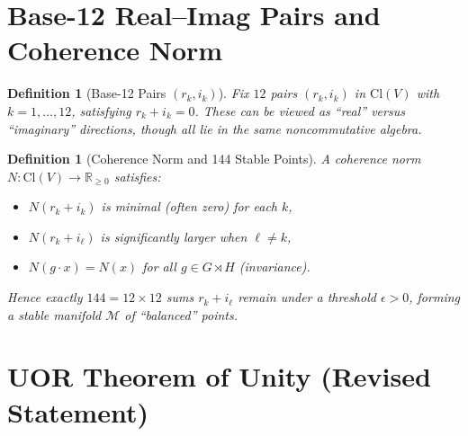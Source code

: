 \documentclass[11pt]{article}
\newtheorem{definition}[theorem]{Definition}
\begin{document}
\section{Base-12 Real--Imag Pairs and Coherence Norm}
\label{sec:base12}

\begin{definition}[Base-12 Pairs $(r_k,i_k)$]
Fix $12$ pairs $(r_k,i_k)$ in $\mathrm{Cl}(V)$ with $k=1,\dots,12$, satisfying $r_k + i_k=0$.  
These can be viewed as “real” versus “imaginary” directions, though all lie in the same noncommutative algebra.
\end{definition}

\begin{definition}[Coherence Norm and 144 Stable Points]
\label{def:coherenceN}
A \emph{coherence norm} $N:\mathrm{Cl}(V)\to \mathbb{R}_{\ge 0}$ satisfies:
\begin{itemize}
    \item $N(r_k + i_k)$ is minimal (often zero) for each $k$,
    \item $N(r_k + i_\ell)$ is significantly larger when $\ell\neq k$,
    \item $N(g \cdot x) = N(x)$ for all $g\in G\rtimes H$ (invariance).
\end{itemize}
Hence exactly $144 = 12\times 12$ sums $r_k + i_\ell$ remain under a threshold $\epsilon>0$, forming a stable manifold $\mathcal{M}$ of “balanced” points.
\end{definition}

\section{UOR Theorem of Unity (Revised Statement)}
\label{sec:UORtheorem}
\end{document}
